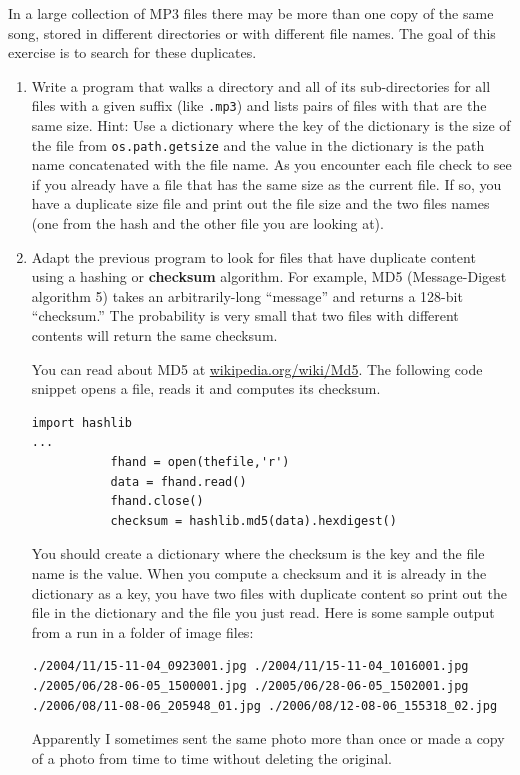 \documentclass[11pt]{book}
\begin{document}
\begin{ex}
\label{checksum}


In a large collection of MP3 files there may be more than one
copy of the same song, stored in different directories or with
different file names.  The goal of this exercise is to search for
these duplicates.

\begin{enumerate}

\item Write a program that walks a directory and all of its
sub-directories for all files with a given suffix (like {\tt .mp3})
and lists pairs of files with that are the same size.
Hint: Use a dictionary where the key of the dictionary is the size
of the file from {\tt  os.path.getsize} and the value in the 
dictionary is the path name concatenated with the file name.  
As you encounter each file check to see if you already have a
file that has the same size as the current file.  
If so, you have a duplicate
size file and print out the file size and the two files names 
(one from the hash and the other file you are looking at).


\item Adapt the previous program to look for files that 
have duplicate content using a hashing or {\bf checksum}
algorithm.  For example,
MD5 (Message-Digest algorithm 5) takes an arbitrarily-long
``message'' and returns a 128-bit ``checksum.''  The probability
is very small that two files with different contents will
return the same checksum.

You can read about MD5 at \url{wikipedia.org/wiki/Md5}.  The 
following code snippet opens a file, reads it and computes
its checksum.

\beforeverb
\begin{verbatim}
import hashlib 
...
           fhand = open(thefile,'r')
           data = fhand.read()
           fhand.close()
           checksum = hashlib.md5(data).hexdigest()
\end{verbatim}
\afterverb
%
You should create a dictionary where the checksum is the key 
and the file name is the value.   When you compute a checksum
and it is already in the dictionary as a key, you have two files with 
duplicate content so print out the file in the dictionary
and the file you just read.  Here is some sample output
from a run in a folder of image files:

\beforeverb
\begin{verbatim}
./2004/11/15-11-04_0923001.jpg ./2004/11/15-11-04_1016001.jpg
./2005/06/28-06-05_1500001.jpg ./2005/06/28-06-05_1502001.jpg
./2006/08/11-08-06_205948_01.jpg ./2006/08/12-08-06_155318_02.jpg
\end{verbatim}
\afterverb
%
Apparently I sometimes sent the same photo more than once 
or made a copy of a photo from time to time without deleting
the original.

\end{enumerate}

\end{ex}
\end{document}

